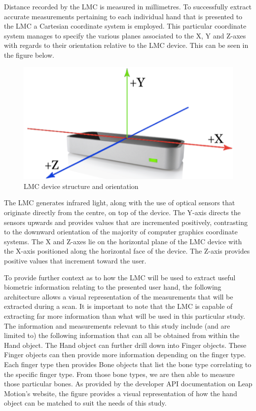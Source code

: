 Distance recorded by the LMC is measured in millimetres. 
To successfully extract accurate measurements pertaining to each individual hand that is presented to the LMC a Cartesian coordinate system is employed. 	This particular coordinate system manages to specify the various planes associated to the X, Y and Z-axes with regards to their orientation relative to the LMC device. This can be seen in the figure below. 

    
    \begin{figure}[htbp!] 
    \centering    
    \includegraphics[width=1.0\textwidth]{Chapter3/Figs/LMC_device_structure_and_orientation.png}
    \caption[LMC device structure and orientation]{LMC device structure and orientation}
    \label{fig:LMC device structure and orientation}
    \end{figure}


The LMC generates infrared light, along with the use of optical sensors that originate directly from the centre, on top of the device. The Y-axis directs the sensors upwards and provides values that are incremented positively, contrasting to the downward orientation of the majority of computer graphics coordinate systems. The X and Z-axes lie on the horizontal plane of the LMC device with the X-axis positioned along the horizontal face of the device. The Z-axis provides positive values that increment toward the user. 

To provide further context as to how the LMC will be used to extract useful biometric information relating to the presented user hand, the following architecture allows a visual representation of the measurements that will be extracted during a scan. It is important to note that the LMC is capable of extracting far more information than what will be used in this particular study. The information and measurements relevant to this study include (and are limited to) the following information that can all be obtained from within the Hand object. The Hand object can further drill down into Finger objects. These Finger objects can then provide more information depending on the finger type. Each finger type then provides Bone objects that list the bone type correlating to the specific finger type. From those bone types, we are then able to measure those particular bones.  As provided by the developer API documentation on Leap Motion’s website, the figure provides a visual representation of how the hand object can be matched to suit the needs of this study.

